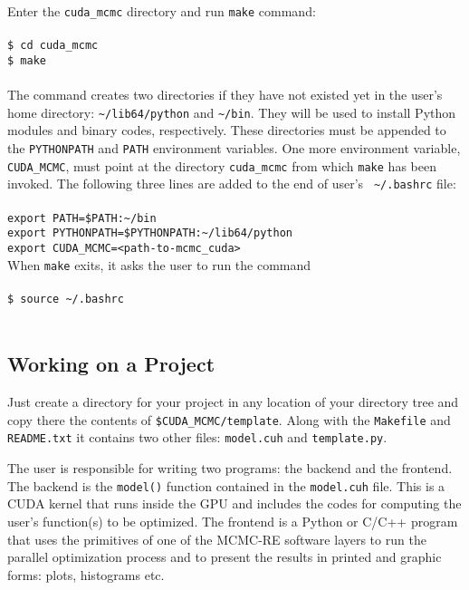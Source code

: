 \documentclass[preprint2]{aastex}
\begin{document}
Enter the \verb"cuda_mcmc" directory and run \verb|make| command: \\\\
\verb|$ cd cuda_mcmc| \\
\verb|$ make| \\\\
The command creates two directories if they have not existed yet in the user's 
home directory: \verb|~/lib64/python| and \verb|~/bin|. They will be used 
to install Python modules and binary codes, respectively. 
These directories must be appended to the \verb|PYTHONPATH| and \verb|PATH| 
environment variables. One more environment variable, \verb|CUDA_MCMC|, must
point at the directory \verb|cuda_mcmc| from which \verb|make| has been invoked. 
The following three lines are added to the end of user's \verb| ~/.bashrc| file: \\\\
\verb|export PATH=$PATH:~/bin| \\
\verb|export PYTHONPATH=$PYTHONPATH:~/lib64/python| \\
\verb|export CUDA_MCMC=<path-to-mcmc_cuda>| \\

When \verb|make| exits, it asks the user to run the command \\\\
\verb|$ source ~/.bashrc| \\\\


\subsection{Working on a Project}

Just create a directory for your project in any location of your directory tree and
copy there the contents of \verb|$CUDA_MCMC/template|. Along with the \verb|Makefile|
and \verb|README.txt| it contains two other files: \verb|model.cuh| and 
\verb|template.py|.  

The user is responsible for writing two programs: the backend and the frontend.
The backend is the \verb|model()| function contained in the \verb|model.cuh| file.
This is a CUDA kernel that runs inside the GPU and includes the codes for
computing the user's function(s) to be optimized. The frontend is a Python or C/C++
program that uses the primitives of one of the MCMC-RE software layers to run
the parallel optimization process and to present the results in printed and graphic
forms: plots, histograms etc. 
\end{document}
